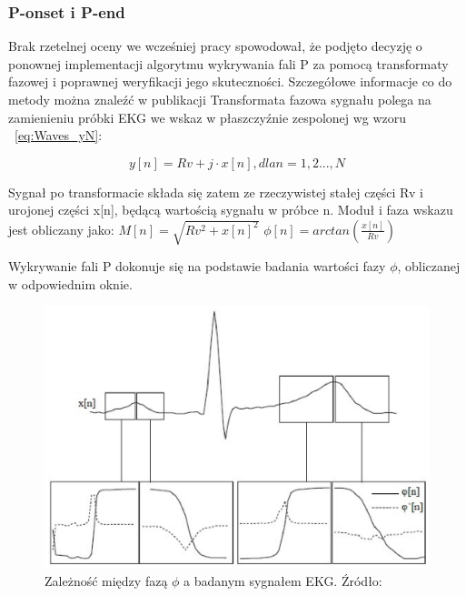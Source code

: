 \subsubsection{P-onset i P-end}
Brak rzetelnej oceny we wcześniej pracy \cite{Waves_ProjZeszlyRok} spowodował, że podjęto decyzję o ponownej implementacji algorytmu wykrywania fali P za pomocą transformaty fazowej i poprawnej weryfikacji jego skuteczności. Szczegółowe informacje co do metody można znaleźć w publikacji \cite{Waves_aNMfADoEFPBotPT}
Transformata fazowa sygnału polega na zamienieniu próbki EKG we wskaz w płaszczyźnie zespolonej wg wzoru ~\ref{eq:Waves_yN}:

\begin{equation} \label{eq:Waves_yN}
y[n]=Rv+j \cdot x[n], dla n=1,2...,N
\end{equation}

Sygnał po transformacie składa się zatem ze rzeczywistej stałej części Rv i urojonej części x[n], będącą wartością sygnału w próbce n. Moduł i faza wskazu jest obliczany jako: \newline
$M[n]=\sqrt{Rv^2+x[n]^2}$ \newline
$\phi [n]= arctan(\frac{x[n]}{Rv})$  \newline

Wykrywanie fali P dokonuje się na podstawie badania wartości fazy $\phi$, obliczanej w odpowiednim oknie.

\begin{figure}[h]
\centering
\includegraphics[width=\textwidth,keepaspectratio] {Waves/img/dzialania_fazowej.eps}
\caption{Zależność między fazą $\phi$ a badanym sygnałem EKG. Źródło: \cite{Waves_aNMfADoEFPBotPT}  }
\label{fig:Waves_DzialFaz}
\end{figure}


